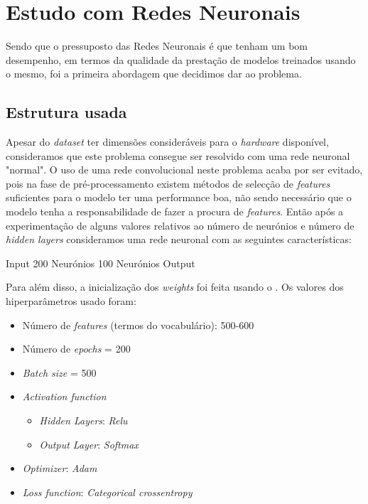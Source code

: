 \section{Estudo com Redes Neuronais}
Sendo que o pressuposto das Redes Neuronais é que tenham um bom desempenho, em termos da qualidade da prestação de modelos treinados usando o mesmo, foi a primeira abordagem que decidimos dar ao problema.

\subsection{Estrutura usada}
Apesar do \textit{dataset} ter dimensões consideráveis para o \textit{hardware} disponível, consideramos que este problema consegue ser resolvido com uma rede neuronal "normal". O uso de uma rede convolucional neste problema acaba por ser evitado, pois na fase de pré-processamento existem métodos de selecção de \textit{features} suficientes para o modelo ter uma performance boa, não sendo necessário que o modelo tenha a responsabilidade de fazer a procura de \textit{features}.
Então após a experimentação de alguns valores relativos ao número de neurónios e número de \textit{hidden layers} consideramos uma rede neuronal com as seguintes características:

Input \textrightarrow{} 200 Neurónios \textrightarrow{} 100 Neurónios \textrightarrow{} Output

Para além disso, a inicialização dos \textit{weights} foi feita usando o   \cite{Glorot_Uniform}. Os valores dos hiperparâmetros usado foram:
\begin{itemize}
    \item Número de \textit{features} (termos do vocabulário): 500-600
    \item Número de \textit{epochs} = 200
    \item \textit{Batch size} = 500
    \item \textit{Activation function} 
        \begin{itemize}
            \item \textit{Hidden Layers}: \textit{Relu} \cite{relu_function}
            \item \textit{Output Layer}: \textit{Softmax} \cite{softmax_function}
        \end{itemize}
    \item \textit{Optimizer}: \textit{Adam} \cite{adam_optimizer}
    \item \textit{Loss function}: \textit{Categorical crossentropy} \cite{categorical_crossentropy_optimizer}
\end{itemize}


